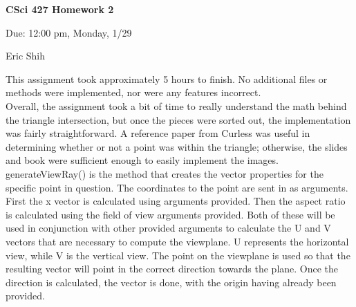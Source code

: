 \documentclass[11pt]{article}
\begin{document}
\begin{LARGE}
\centerline {\bf CSci 427 Homework 2}
\end{LARGE}
\vskip 0.25cm

\centerline{Due: 12:00 pm, Monday, 1/29}
\centerline{Eric Shih}

\setlength{\parindent}{1cm}
\begin{spacing}{1.5}
\indent This assignment took approximately 5 hours to finish. No additional files or methods were implemented, nor were any features
incorrect. \\
\indent Overall, the assignment took a bit of time to really understand the math behind the triangle intersection, but once the pieces were sorted
out, the implementation was fairly straightforward. A reference paper from Curless was useful in determining whether or not a point was
within the triangle; otherwise, the slides and book were sufficient enough to easily implement the images. \\
\indent generateViewRay() is the method that creates the vector properties for the specific point in question. The coordinates to the point
are sent in as arguments.  First the x vector is calculated using arguments provided. Then the aspect ratio is calculated using the field of
view arguments provided. Both of these will be used in conjunction with other provided arguments to calculate the U and V vectors that are
necessary to compute the viewplane. U represents the horizontal view, while V is the vertical view. The point on the viewplane is used so
that the resulting vector will point in the correct direction towards the plane. Once the direction is calculated, the vector is done, with
the origin having already been provided.
\end{spacing}
\end{document}
